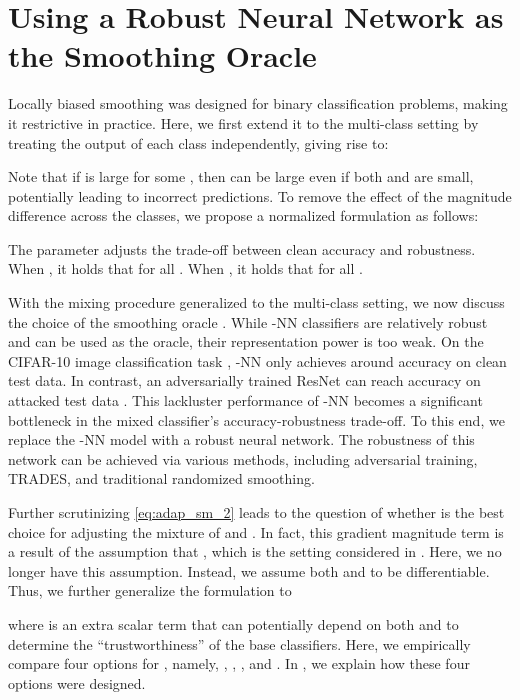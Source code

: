 \documentclass[11pt, letterpaper]{article}
\theoremstyle{plain}
\theoremstyle{definition}
\begin{document}
\section{Using a Robust Neural Network as the Smoothing Oracle} \label{sec:STD+ROB}

Locally biased smoothing was designed for binary classification problems, making it restrictive in practice. Here, we first extend it to the multi-class setting by treating the output  of each class independently, giving rise to:


Note that if  is large for some , then  can be large even if both  and  are small, potentially leading to incorrect predictions. To remove the effect of the magnitude difference across the classes, we propose a normalized formulation as follows:


The parameter  adjusts the trade-off between clean accuracy and robustness. When , it holds that  for all . When , it holds that  for all .

With the mixing procedure generalized to the multi-class setting, we now discuss the choice of the smoothing oracle . While -NN classifiers are relatively robust and can be used as the oracle, their representation power is too weak. On the CIFAR-10 image classification task \cite{cifar10}, -NN only achieves around  accuracy on clean test data. In contrast, an adversarially trained ResNet \citep{He16} can reach  accuracy on attacked test data \cite{Madry18}. This lackluster performance of -NN becomes a significant bottleneck in the mixed classifier's accuracy-robustness trade-off. To this end, we replace the -NN model with a robust neural network. The robustness of this network can be achieved via various methods, including adversarial training, TRADES, and traditional randomized smoothing.

Further scrutinizing \cref{eq:adap_sm_2} leads to the question of whether  is the best choice for adjusting the mixture of  and . In fact, this gradient magnitude term is a result of the assumption that , which is the setting considered in \cite{Anderson21b}. Here, we no longer have this assumption. Instead, we assume both  and  to be differentiable. Thus, we further generalize the formulation to

where  is an extra scalar term that can potentially depend on both  and  to determine the ``trustworthiness'' of the base classifiers. Here, we empirically compare four options for , namely, , , , and . In , we explain how these four options were designed.
\end{document}
